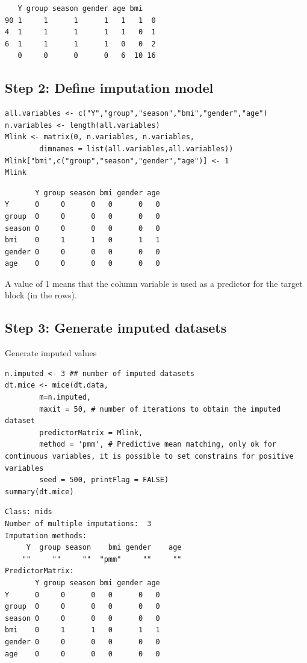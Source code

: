 \documentclass[12pt]{article}
\begin{document}
\begin{verbatim}
   Y group season gender age bmi   
90 1     1      1      1   1   1  0
4  1     1      1      1   1   0  1
6  1     1      1      1   0   0  2
   0     0      0      0   6  10 16
\end{verbatim}

\clearpage

\subsection{Step 2: Define imputation model}
\label{sec:orga4503bb}

\lstset{language=r,label= ,caption= ,captionpos=b,numbers=none}
\begin{lstlisting}
all.variables <- c("Y","group","season","bmi","gender","age")
n.variables <- length(all.variables)
Mlink <- matrix(0, n.variables, n.variables,
		dimnames = list(all.variables,all.variables))
Mlink["bmi",c("group","season","gender","age")] <- 1
Mlink
\end{lstlisting}

\begin{verbatim}
       Y group season bmi gender age
Y      0     0      0   0      0   0
group  0     0      0   0      0   0
season 0     0      0   0      0   0
bmi    0     1      1   0      1   1
gender 0     0      0   0      0   0
age    0     0      0   0      0   0
\end{verbatim}

A value of 1 means that the column variable is used as a predictor for
 the target block (in the rows).

\clearpage

\subsection{Step 3: Generate imputed datasets}
\label{sec:orgb3c5893}
Generate imputed values
\lstset{language=r,label= ,caption= ,captionpos=b,numbers=none}
\begin{lstlisting}
n.imputed <- 3 ## number of imputed datasets
dt.mice <- mice(dt.data,
		m=n.imputed, 
		maxit = 50, # number of iterations to obtain the imputed dataset
		predictorMatrix = Mlink,
		method = 'pmm', # Predictive mean matching, only ok for continuous variables, it is possible to set constrains for positive variables
		seed = 500, printFlag = FALSE)
summary(dt.mice)
\end{lstlisting}

\begin{verbatim}
Class: mids
Number of multiple imputations:  3 
Imputation methods:
     Y  group season    bmi gender    age 
    ""     ""     ""  "pmm"     ""     "" 
PredictorMatrix:
       Y group season bmi gender age
Y      0     0      0   0      0   0
group  0     0      0   0      0   0
season 0     0      0   0      0   0
bmi    0     1      1   0      1   1
gender 0     0      0   0      0   0
age    0     0      0   0      0   0
\end{verbatim}
\end{document}

